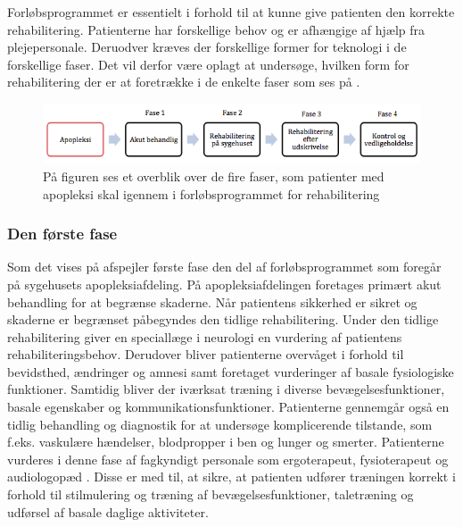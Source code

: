 Forløbsprogrammet er essentielt i forhold til at kunne give patienten den korrekte rehabilitering. Patienterne har forskellige behov og er afhængige af hjælp fra plejepersonale. Deruodver kræves der forskellige former for teknologi i de forskellige faser. Det vil derfor være oplagt at undersøge, hvilken form for rehabilitering der er at foretrække i de enkelte faser som ses på .

\begin{figure}[H]
	\centering
	\includegraphics[scale=0.6]{figures/bProblemanalyse/flowdiagram_faser1.png}
	\caption{På figuren ses et overblik over de fire faser, som patienter med apopleksi skal igennem i forløbsprogrammet for rehabilitering \cite{Sundhedsstyrelsen2011a}} 
	\label{firefaser}
\end{figure}

\subsubsection{Den første fase}
Som det vises på  afspejler første fase den del af forløbsprogrammet som foregår på sygehusets apopleksiafdeling. På apopleksiafdelingen foretages primært akut behandling for at begrænse skaderne. Når patientens sikkerhed er sikret og skaderne er begrænset påbegyndes den tidlige rehabilitering. Under den tidlige rehabilitering giver en speciallæge i neurologi en vurdering af patientens rehabiliteringsbehov. Derudover bliver patienterne overvåget i forhold til bevidsthed, ændringer og amnesi samt foretaget vurderinger af basale fysiologiske funktioner. Samtidig bliver der iværksat træning i diverse bevægelsesfunktioner, basale egenskaber og kommunikationsfunktioner. Patienterne gennemgår også en tidlig behandling og diagnostik for at undersøge komplicerende tilstande, som f.eks. vaskulære hændelser, blodpropper i ben og lunger og smerter. Patienterne vurderes i denne fase af fagkyndigt personale som ergoterapeut, fysioterapeut og audiologopæd . Disse er med til, at sikre, at patienten udfører træningen korrekt i forhold til stilmulering og træning af bevægelsesfunktioner, taletræning og udførsel af basale daglige aktiviteter.\cite{Sundhedsstyrelsen2011a}

